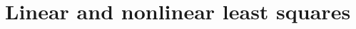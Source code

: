 \documentclass[12pt, leqno]{article} %
\begin{document}

\section{Linear and nonlinear least squares}
\end{document}
